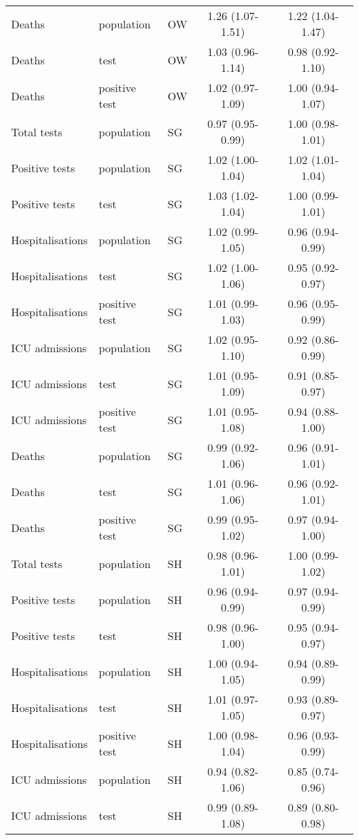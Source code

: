 \documentclass{article}
\begin{document}
\begin{longtable}{lllcc}
		Deaths & population & OW & 1.26 (1.07-1.51) & 1.22 (1.04-1.47) \\ 
		Deaths & test & OW & 1.03 (0.96-1.14) & 0.98 (0.92-1.10) \\ 
		Deaths & positive test & OW & 1.02 (0.97-1.09) & 1.00 (0.94-1.07) \\ 
		Total tests & population & SG & 0.97 (0.95-0.99) & 1.00 (0.98-1.01) \\ 
		Positive tests & population & SG & 1.02 (1.00-1.04) & 1.02 (1.01-1.04) \\ 
		Positive tests & test & SG & 1.03 (1.02-1.04) & 1.00 (0.99-1.01) \\ 
		Hospitalisations & population & SG & 1.02 (0.99-1.05) & 0.96 (0.94-0.99) \\ 
		Hospitalisations & test & SG & 1.02 (1.00-1.06) & 0.95 (0.92-0.97) \\ 
		Hospitalisations & positive test & SG & 1.01 (0.99-1.03) & 0.96 (0.95-0.99) \\ 
		ICU admissions & population & SG & 1.02 (0.95-1.10) & 0.92 (0.86-0.99) \\ 
		ICU admissions & test & SG & 1.01 (0.95-1.09) & 0.91 (0.85-0.97) \\ 
		ICU admissions & positive test & SG & 1.01 (0.95-1.08) & 0.94 (0.88-1.00) \\ 
		Deaths & population & SG & 0.99 (0.92-1.06) & 0.96 (0.91-1.01) \\ 
		Deaths & test & SG & 1.01 (0.96-1.06) & 0.96 (0.92-1.01) \\ 
		Deaths & positive test & SG & 0.99 (0.95-1.02) & 0.97 (0.94-1.00) \\ 
		Total tests & population & SH & 0.98 (0.96-1.01) & 1.00 (0.99-1.02) \\ 
		Positive tests & population & SH & 0.96 (0.94-0.99) & 0.97 (0.94-0.99) \\ 
		Positive tests & test & SH & 0.98 (0.96-1.00) & 0.95 (0.94-0.97) \\ 
		Hospitalisations & population & SH & 1.00 (0.94-1.05) & 0.94 (0.89-0.99) \\ 
		Hospitalisations & test & SH & 1.01 (0.97-1.05) & 0.93 (0.89-0.97) \\ 
		Hospitalisations & positive test & SH & 1.00 (0.98-1.04) & 0.96 (0.93-0.99) \\ 
		ICU admissions & population & SH & 0.94 (0.82-1.06) & 0.85 (0.74-0.96) \\ 
		ICU admissions & test & SH & 0.99 (0.89-1.08) & 0.89 (0.80-0.98) \\ 

\end{longtable}
\end{document}

